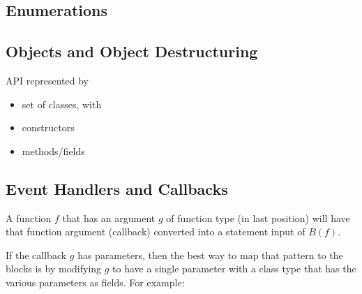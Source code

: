 
\subsection{Enumerations}

\subsection{Objects and Object Destructuring}
API represented by
\begin{itemize}
  \item set of classes, with
  \item constructors
  \item methods/fields
\end{itemize}

\subsection{Event Handlers and Callbacks}


A function $f$ that has an argument $g$ of function type (in last position) will have
that function argument (callback) converted into a statement input of $B(f)$.

If the callback $g$ has parameters, then
the best way to map that pattern to the blocks is by modifying
$g$ to have a single parameter with a class type that has the
various parameters as fields.
For example:




